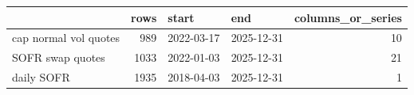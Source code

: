 \begin{tabular}{lrllr}
\toprule
 & rows & start & end & columns\_or\_series \\
\midrule
cap normal vol quotes & 989 & 2022-03-17 & 2025-12-31 & 10 \\
SOFR swap quotes & 1033 & 2022-01-03 & 2025-12-31 & 21 \\
daily SOFR & 1935 & 2018-04-03 & 2025-12-31 & 1 \\
\bottomrule
\end{tabular}
